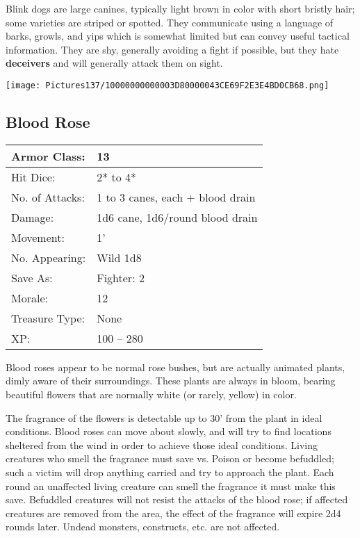 \documentclass[a4paper,twoside,openany,10pt]{book}
\begin{document}
\begin{multicols}{2}
Blink dogs are large canines, typically light brown in color with short bristly hair; some varieties are striped or spotted. They communicate using a language of barks, growls, and yips which is somewhat limited but can convey useful tactical information. They are shy, generally avoiding a fight if possible, but they hate \textbf{deceivers} and will generally attack them on sight.


\begin{center}
	\texttt{[image: Pictures137/10000000000003D80000043CE69F2E3E4BD0CB68.png]}
\end{center}

\subsection*{Blood Rose}\label{blood-rose}

\begin{tabularx}{0.48\textwidth}{@{}lX@{}}
	Armor Class: & 13 \\\hline
Hit Dice: & 2* to 4* \\\hline
No. of Attacks: & 1 to 3 canes, each + blood drain \\\hline
Damage: & 1d6 cane, 1d6/round blood drain \\\hline
Movement: & 1' \\\hline
No. Appearing: & Wild 1d8 \\\hline
Save As: & Fighter: 2 \\\hline
Morale: & 12 \\\hline
Treasure Type: & None \\\hline
XP: & 100 -- 280 \\\hline
\end{tabularx}\medskip

Blood roses appear to be normal rose bushes, but are actually animated plants, dimly aware of their surroundings. These plants are always in bloom, bearing beautiful flowers that are normally white (or rarely, yellow) in color.

The fragrance of the flowers is detectable up to 30' from the plant in ideal conditions. Blood roses can move about slowly, and will try to find locations sheltered from the wind in order to achieve those ideal conditions. Living creatures who smell the fragrance must save vs. Poison or become befuddled; such a victim will drop anything carried and try to approach the plant. Each round an unaffected living creature can smell the fragrance it must make this save. Befuddled creatures will not resist the attacks of the blood rose; if affected creatures are removed from the area, the effect of the fragrance will expire 2d4 rounds later. Undead monsters, constructs, etc. are not affected.


\end{multicols}
\end{document}
